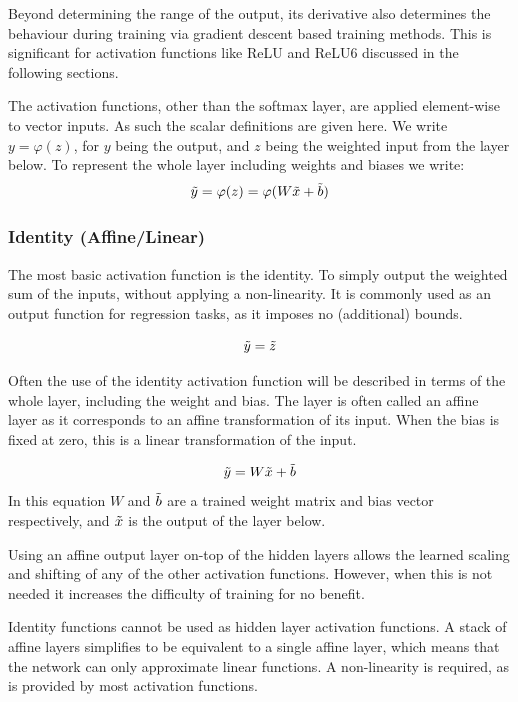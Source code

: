 \documentclass[12pt,parskip]{komatufte}
\begin{document}
Beyond determining the range of the output, its derivative also determines the behaviour during training via gradient descent based training methods.
This is significant for activation functions like ReLU and ReLU6 discussed in the following sections.

The activation functions, other than the softmax layer, are applied element-wise to vector inputs.
As such the scalar definitions are given here.
We write $y = \varphi(z)$, for $y$ being the output, and $z$ being the weighted input from the layer below.
To represent the whole layer including weights and biases we write:
\begin{equation}
\tilde{y} =\varphi(z) = \varphi(W \tilde{x} + \tilde{b})
\end{equation}

\subsubsection{Identity (Affine/Linear)}
The most basic activation function is the identity.
To simply output the weighted sum of the inputs, without applying a non-linearity.
It is commonly used as an output function for regression tasks,
as it imposes no (additional) bounds.

\begin{equation}
\tilde{y}= \tilde{z}
\end{equation}

Often the use of the identity activation function will be described in terms of the whole layer, including the weight and bias.
The layer is often called an affine layer as it corresponds to an affine transformation of its input.
When the bias is fixed at zero, this is a linear transformation of the input.

\begin{equation}
\tilde{y}=W \tilde{x} + \tilde{b}
\end{equation}
In this equation $W$ and $\tilde{b}$ are a trained weight matrix and bias vector respectively,
and $\tilde{x}$ is the output of the layer below.

Using an affine output layer on-top of the hidden layers
allows the learned scaling and shifting of any of the other activation functions.
However, when this is not needed it increases the difficulty of training for no benefit.

Identity functions cannot be used as hidden layer activation functions.
A stack of affine layers simplifies to be equivalent to a single affine layer, which means that the network can only approximate linear functions.
A non-linearity is required, as is provided by most activation functions.
\end{document}
